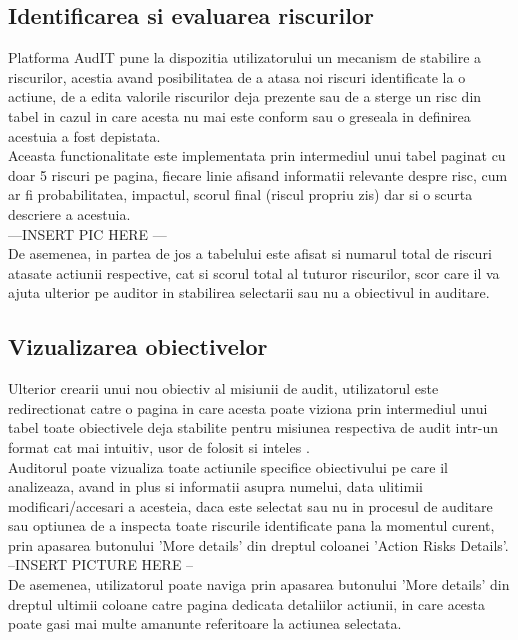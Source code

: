 \subsection{Identificarea si evaluarea riscurilor}
Platforma AudIT pune la dispozitia utilizatorului un mecanism de stabilire a riscurilor, acestia avand posibilitatea de a atasa noi riscuri identificate la o actiune, de a edita valorile riscurilor deja prezente sau de a sterge un risc din tabel in cazul in care acesta nu mai este conform sau o greseala in definirea acestuia a fost depistata.\\
Aceasta functionalitate este implementata prin intermediul unui tabel paginat cu doar 5 riscuri pe pagina, fiecare linie afisand informatii relevante despre risc, cum ar fi probabilitatea, impactul, scorul final (riscul propriu zis) dar si o scurta descriere a acestuia.\\
---INSERT PIC HERE --- \\
De asemenea, in partea de jos a tabelului este afisat si numarul total de riscuri atasate actiunii respective, cat si scorul total al tuturor riscurilor, scor care il va ajuta ulterior pe auditor in stabilirea selectarii sau nu a obiectivul in auditare.

\subsection{Vizualizarea obiectivelor}

Ulterior crearii unui nou obiectiv al misiunii de audit, utilizatorul este redirectionat catre o pagina in care acesta poate viziona prin intermediul unui tabel toate obiectivele deja stabilite pentru misiunea respectiva de audit intr-un format cat mai intuitiv, usor de folosit si inteles .\\
Auditorul poate vizualiza toate actiunile specifice obiectivului pe care il analizeaza, avand in plus si informatii asupra numelui, data ulitimii modificari/accesari a acesteia, daca este selectat sau nu in procesul de auditare sau optiunea de a inspecta toate riscurile identificate pana la momentul curent, prin apasarea butonului 'More details' din dreptul coloanei 'Action Risks Details'.\\
--INSERT PICTURE HERE --\\
De asemenea, utilizatorul poate naviga prin apasarea butonului 'More details' din dreptul ultimii coloane catre pagina dedicata detaliilor actiunii, in care acesta poate gasi mai multe amanunte referitoare la actiunea selectata.

